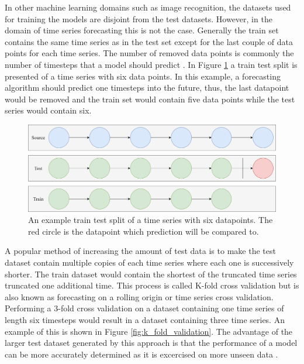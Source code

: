 In other machine learning domains such as image recognition, the datasets used for training the models are disjoint from the test datasets. However, in the domain of time series forecasting this is not the case. Generally the train set contains the same time series as in the test set except for the last couple of data points for each time series. The number of removed data points is commonly the number of timesteps that a model should predict \cite{hyndman_forecasting_3rd}. In Figure \ref{fig:train_test_split} a train test split is presented of a time series with six data points. In this example, a forecasting algorithm should predict one timesteps into the future, thus, the last datapoint would be removed and the train set would contain five data points while the test series would contain six.

\begin{figure}[htb]
  \centering
  \includegraphics[width=\linewidth]{./img/train_test_split.png}
  \caption{An example train test split of a time series with six datapoints. The red circle is the datapoint which prediction will be compared to.}
  \label{fig:train_test_split}
  \endminipage\hfill
\end{figure}


A popular method of increasing the amount of test data is to make the test dataset contain multiple copies of each time series where each one is successively shorter. The train dataset would contain the shortest of the truncated time series truncated one additional time. This process is called K-fold cross validation but is also known as forecasting on a rolling origin or time series cross validation. Performing a 3-fold cross validation on a dataset containing one time series of length six timesteps would result in a dataset containing three time series. An example of this is shown in Figure \ref{fig:k_fold_validation}. The advantage of the larger test dataset generated by this approach is that the performance of a model can be more accurately determined as it is excercised on more unseen data \cite{hyndman_forecasting_3rd}.

